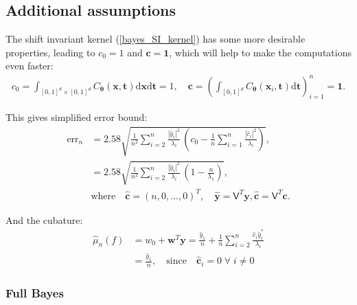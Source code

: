 \documentclass[twocolumn]{svjour3}          %
\newcommand{\bm}[1]{\boldsymbol{#1}}
\newcommand{\dif}[1]{\text{d}{#1}}
\newcommand{\vtheta}{{\bm{\theta}}}
\newcommand{\vc}{\bm{c}}
\newcommand{\vt}{\bm{t}}
\newcommand{\vw}{\bm{w}}
\newcommand{\vx}{\bm{x}}
\newcommand{\dvx}{\dif{\bm{x}}}
\newcommand{\dvt}{\dif{\bm{t}}}
\newcommand{\vy}{\bm{y}}
\newcommand{\vone}{\bm{1}}
\newcommand{\mV}{\mathsf{V}}
\newcommand{\hmu}{\hat{\mu}}
\newcommand{\errn}{\text{err}_{n}}
\def\abs#1{\ensuremath{\left \lvert #1 \right \rvert}}
\begin{document}
\subsection{Additional assumptions}
The shift invariant kernel (\ref{bayes_SI_kernel}) has some more desirable properties, leading to $c_0=1$ and $\vc = \vone$, which will help to make the computations even faster:
\begin{align*}
\displaystyle
c_0 =\int_{[0,1]^d\times [0,1]^d}C_\vtheta(\vx,\vt) \dvx \dvt = 1, \quad \vc = \left( \int_{[0,1]^d}C_\vtheta(\vx_i,\vt) \dvt\right)_{i=1}^n = \vone .
\end{align*}

This gives simplified error bound:
\begin{align*}
\errn &=
2.58\sqrt{
\frac {1}{n^2} \sum_{i=2}^{n} \frac{\abs{\widehat{y}_i}^2}{\lambda_i}  
\,
\left( c_0 - \frac 1n \sum_{i=1}^n \frac{\abs{\widehat{c}_i}^2}{\lambda_i} \right) 
}, 
\\
&= 
2.58\sqrt{
\frac {1}{n^2} \sum_{i=2}^{n} \frac{\abs{\widehat{y}_i}^2}{\lambda_i}  
\,
\left( 1 - \frac{n}{\lambda_1}  \right) 
}, 
\\
& \text{where} \quad \widehat{\vc} = (n,0,...,0)^T, \quad 
\widehat{\vy} = \mV^T \vy,  
\widehat{\vc} = \mV^T \vc. 
\end{align*}


And the cubature:
\begin{align*}
\nonumber
\hmu_n(f) &= w_0 + \vw^T \vy 
= 
\frac{\widehat{y}_1}{n} +
\frac 1n \sum_{i=2}^n \frac{ \widehat{c}_i \widehat{y}_i^*}{\lambda_i} \\
& = \frac{\widehat{y}_1}{n}, \quad \text{since} \quad
 \widehat{\vc}_i=0 \; \forall \; i \neq 0
\end{align*}





\subsubsection{Full Bayes}
\end{document}

